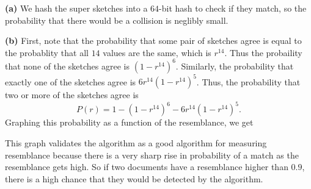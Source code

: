 \documentclass[11pt,letterpaper]{article}
\begin{document}
\begin{solution}
    \textbf{(a)} We hash the super sketches into a $64$-bit hash to check if they match, so the probability that there would be a collision is neglibly small.

    \textbf{(b)} First, note that the probability that some pair of sketches agree is equal to the probablity that all $14$ values are the same, which is $r^{14}$. Thus the probaility that none of the sketches agree is $(1-r^{14})^6$. Similarly, the probability that exactly one of the sketches agree is $6r^{14}(1-r^{14})^5$. Thus, the probability that two or more of the sketches agree is
    \[
        P(r)=1-(1-r^{14})^6 - 6r^{14}(1-r^{14})^5
    .\]  
    Graphing this probability as a function of the resemblance, we get
    \begin{center}
    \end{center}
    This graph validates the algorithm as a good algorithm for measuring resemblance because there is a very sharp rise in probability of a match as the resemblance gets high. So if two documents have a resemblance higher than $0.9$, there is a high chance that they would be detected by the algorithm.


\end{solution}
\end{document}
